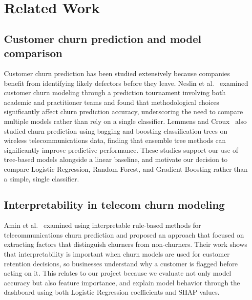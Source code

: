 \documentclass{article}
\begin{document}
\section{Related Work}
\subsection{Customer churn prediction and model comparison}
Customer churn prediction has been studied extensively because companies benefit from identifying likely defectors before they leave. Neslin et al.~\cite{neslin2006} examined customer churn modeling through a prediction tournament involving both academic and practitioner teams and found that methodological choices significantly affect churn prediction accuracy, underscoring the need to compare multiple models rather than rely on a single classifier. Lemmens and Croux~\cite{lemmens2006} also studied churn prediction using bagging and boosting classification trees on wireless telecommunications data, finding that ensemble tree methods can significantly improve predictive performance. These studies support our use of tree-based models alongside a linear baseline, and motivate our decision to compare Logistic Regression, Random Forest, and Gradient Boosting rather than a simple, single classifier.

\subsection{Interpretability in telecom churn modeling}
 Amin et al.~\cite{amin2017} examined using interpretable rule-based methods for telecommunications churn prediction and proposed an approach that focused on extracting factors that distinguish churners from non-churners. Their work shows that interpretability is important when churn models are used for customer retention decisions, so businesses understand why a customer is flagged before acting on it. This relates to our project because we evaluate not only model accuracy but also feature importance, and explain model behavior through the dashboard using both Logistic Regression coefficients and SHAP values.
\end{document}
